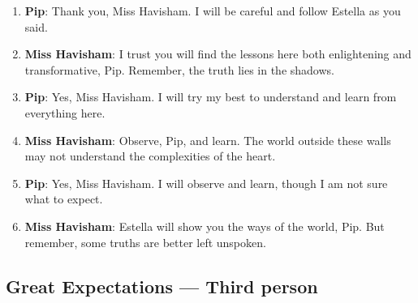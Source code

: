 \documentclass[10pt]{article}
\begin{document}
\begin{enumerate}
\item \textbf{Pip}: Thank you, Miss Havisham. I will be careful and follow Estella as you said.

\item \textbf{Miss Havisham}: I trust you will find the lessons here both enlightening and transformative, Pip. Remember, the truth lies in the shadows.

\item \textbf{Pip}: Yes, Miss Havisham. I will try my best to understand and learn from everything here.

\item \textbf{Miss Havisham}: Observe, Pip, and learn. The world outside these walls may not understand the complexities of the heart.

\item \textbf{Pip}: Yes, Miss Havisham. I will observe and learn, though I am not sure what to expect.

\item \textbf{Miss Havisham}: Estella will show you the ways of the world, Pip. But remember, some truths are better left unspoken.

\end{enumerate}

\subsection*{Great Expectations --- Third person}
\end{document}
